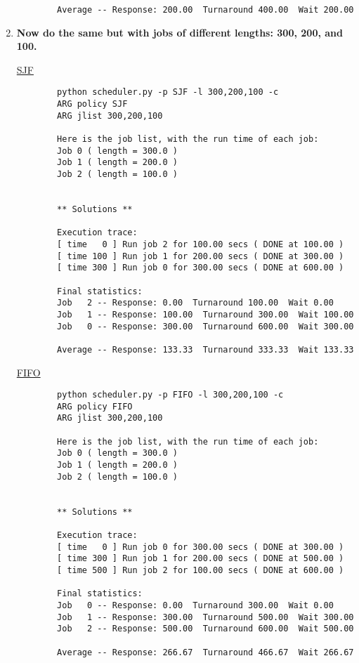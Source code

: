 \documentclass{article}
\begin{document}
\begin{enumerate}
\begin{verbatim}
        Average -- Response: 200.00  Turnaround 400.00  Wait 200.00
    \end{verbatim}

    \item \textbf{Now do the same but with jobs of different lengths: 300, 200, and 100.}
    
    \underline{SJF}
    \begin{verbatim}
        python scheduler.py -p SJF -l 300,200,100 -c
        ARG policy SJF
        ARG jlist 300,200,100

        Here is the job list, with the run time of each job: 
        Job 0 ( length = 300.0 )
        Job 1 ( length = 200.0 )
        Job 2 ( length = 100.0 )


        ** Solutions **

        Execution trace:
        [ time   0 ] Run job 2 for 100.00 secs ( DONE at 100.00 )
        [ time 100 ] Run job 1 for 200.00 secs ( DONE at 300.00 )
        [ time 300 ] Run job 0 for 300.00 secs ( DONE at 600.00 )

        Final statistics:
        Job   2 -- Response: 0.00  Turnaround 100.00  Wait 0.00
        Job   1 -- Response: 100.00  Turnaround 300.00  Wait 100.00
        Job   0 -- Response: 300.00  Turnaround 600.00  Wait 300.00

        Average -- Response: 133.33  Turnaround 333.33  Wait 133.33
    \end{verbatim}

    \underline{FIFO}
    \begin{verbatim}
        python scheduler.py -p FIFO -l 300,200,100 -c
        ARG policy FIFO
        ARG jlist 300,200,100

        Here is the job list, with the run time of each job: 
        Job 0 ( length = 300.0 )
        Job 1 ( length = 200.0 )
        Job 2 ( length = 100.0 )


        ** Solutions **

        Execution trace:
        [ time   0 ] Run job 0 for 300.00 secs ( DONE at 300.00 )
        [ time 300 ] Run job 1 for 200.00 secs ( DONE at 500.00 )
        [ time 500 ] Run job 2 for 100.00 secs ( DONE at 600.00 )

        Final statistics:
        Job   0 -- Response: 0.00  Turnaround 300.00  Wait 0.00
        Job   1 -- Response: 300.00  Turnaround 500.00  Wait 300.00
        Job   2 -- Response: 500.00  Turnaround 600.00  Wait 500.00

        Average -- Response: 266.67  Turnaround 466.67  Wait 266.67
    \end{verbatim}


\end{enumerate}
\end{document}

